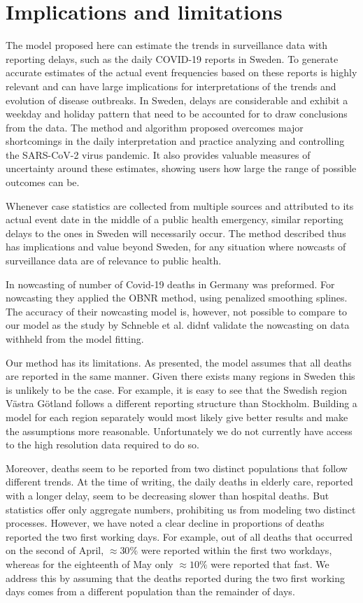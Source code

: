 \documentclass[a4paper,11pth]{article}
\begin{document}
\section{Implications and limitations}
The model proposed here can estimate the trends in surveillance data with reporting delays, such as the daily COVID-19 reports in Sweden. To generate accurate estimates of the actual event frequencies based on these reports is highly relevant and can have large implications for interpretations of the trends and evolution of disease outbreaks. In Sweden, delays are considerable and exhibit a weekday and holiday pattern that need to be accounted for to draw conclusions from the data. The method and algorithm proposed overcomes major shortcomings in the daily interpretation and practice analyzing and controlling the SARS-CoV-2 virus pandemic. It also provides valuable measures of uncertainty around these estimates, showing users how large the range of possible outcomes can be.

Whenever case statistics are collected from multiple sources and attributed to its actual event date in the middle of a public health emergency, similar reporting delays to the ones in Sweden will necessarily occur. The method described thus has implications and value beyond Sweden, for any situation where nowcasts of surveillance data are of relevance to public health.

In \cite{schneble2020nowcasting} nowcasting of number of Covid-19 deaths in Germany was preformed. For nowcasting they applied the OBNR method, using penalized smoothing splines. The accuracy of their nowcasting model is, however, not possible to compare to our model as the study by Schneble et al. didn\'t validate the nowcasting on data withheld from the model fitting. 

Our method has its limitations. As presented, the model assumes that all deaths are reported in the same manner. Given there exists many regions in Sweden this is unlikely to be the case. For example, it is easy to see that the Swedish region Västra Götland follows a different reporting structure than Stockholm. Building a model for each region separately would most likely give better results and make the assumptions more reasonable. Unfortunately we do not currently have access to the high resolution data required to do so. 

Moreover, deaths seem to be reported from two distinct populations that follow different trends. At the time of writing, the daily deaths in elderly care, reported with a longer delay, seem to be decreasing slower than hospital deaths. But statistics offer only aggregate numbers, prohibiting us from modeling two distinct processes. However, we have noted a clear decline in proportions of deaths reported the two first working days. For example, out of all deaths that occurred on the second of April, $\approx 30\%$ were reported within the first two workdays, whereas for the eighteenth of May only $\approx 10\%$ were reported that fast. We address this by assuming that the deaths reported during the two first working days comes from a different population than the remainder of days.
\end{document}
